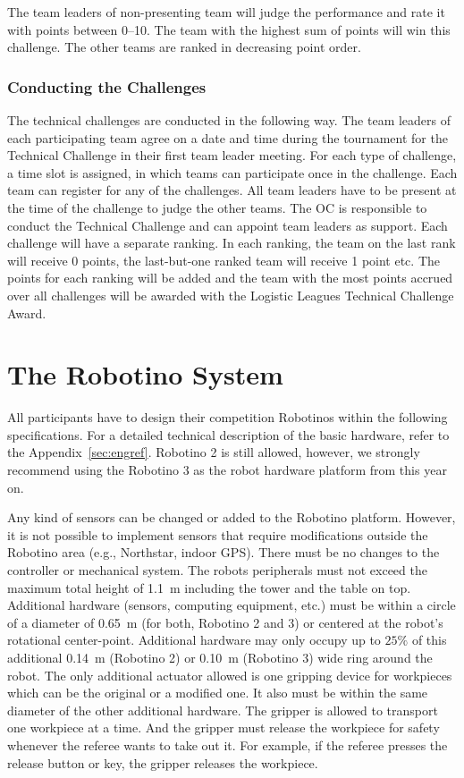 \documentclass[12pt,twoside]{article}
\begin{document}
The team leaders of non-presenting team will judge the performance and
rate it with points between 0--10.  The team with the highest sum of
points will win this challenge. The other teams are ranked in
decreasing point order.

\subsubsection{Conducting the Challenges~}
The technical challenges are conducted in the following way. The team
leaders of each participating team agree on a date and time during the
tournament for the Technical Challenge in their first team leader
meeting. For each type of challenge, a time slot is assigned, in which
teams can participate once in the challenge. Each team can register
for any of the challenges. All team leaders have to be present at the
time of the challenge to judge the other teams. The OC is responsible
to conduct the Technical Challenge and can appoint team leaders as
support. Each challenge will have a separate ranking. In each ranking,
the team on the last rank will receive 0 points, the last-but-one
ranked team will receive 1 point etc. The points for each ranking will
be added and the team with the most points accrued over all challenges
will be awarded with the Logistic Leagues Technical Challenge Award.


\section{The Robotino System}
\label{sec:robotino}

All participants have to design their competition Robotinos within the
following specifications. For a detailed technical description of the
basic hardware, refer to the Appendix~\ref{sec:engref}. Robotino 2 is
still allowed, however, we strongly recommend using the Robotino 3 as
the robot hardware platform from this year on.

Any kind of sensors can be changed or added to	 the Robotino platform.
However, it is not possible to implement sensors that require
modifications outside the Robotino area (e.g., Northstar, indoor GPS).
There must be no changes to the controller or mechanical system.
The robots peripherals must not exceed the maximum total height of
\SI{1.1}{\metre} including the tower and the table on top. Additional
hardware (sensors, computing equipment, etc.)  must be within a circle
of a diameter of \SI{0.65}{\metre}  (for both, Robotino 2 and 3) or
centered at the robot's rotational center-point. Additional hardware
may only occupy up to $25\%$ of this additional \SI{0.14}{\metre}
(Robotino 2) or \SI{0.10}{\metre} (Robotino 3) wide ring around the
robot. The only additional actuator allowed is one gripping device for
workpieces which can be the original or a modified one. It also must
be within the same diameter of the other additional hardware. The
gripper is allowed to transport one workpiece at a time. And the
gripper must release the workpiece for safety whenever the referee
wants to take out it. For example, if the referee presses the release
button or key, the gripper releases the workpiece.
\end{document}
